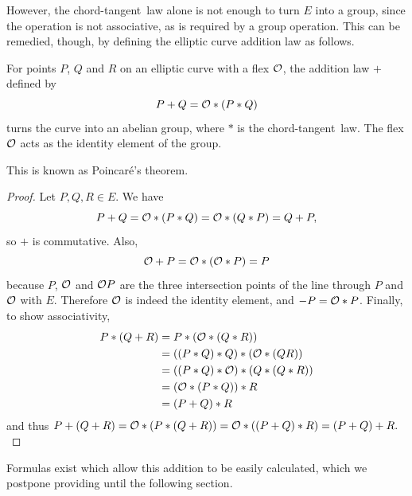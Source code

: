 However, the chord-tangent~law alone is not enough to turn $E$ into a group, since the operation is not associative, as is required by a group operation.
This can be remedied, though, by defining the elliptic curve addition law as follows.
\begin{theorem}
	For points $P$, $Q$ and $R$ on an elliptic curve with a flex $\mathcal{O}$, the addition law $+$ defined by
	$$P + Q = \mathcal{O} * (P * Q)$$
	turns the curve into an abelian group, where $*$ is the chord-tangent~law.
	The flex $\mathcal{O}$ acts as the identity element of the group.
\end{theorem}
This is known as Poincaré's theorem.
\begin{proof}
	Let $P,Q,R \in E$.
	We have
	$$P + Q = \mathcal{O} * (P * Q) = \mathcal{O} * (Q * P) = Q + P,$$
	so $+$ is commutative.
	Also,
	$$\mathcal{O} + P = \mathcal{O} * (\mathcal{O} * P) = P$$
	because $P$, $\mathcal{O}$ and $\mathcal{O} P$ are the three intersection points of the line through $P$ and $\mathcal{O}$ with $E$.
	Therefore $\mathcal{O}$ is indeed the identity element, and $-P = \mathcal{O} * P$.
	Finally, to show associativity,
	\begin{align*}
		P * (Q + R) &= P * (\mathcal{O} * ( Q * R))\\
		&= ((P*Q)*Q)*(\mathcal{O}*(QR))\\
		&= ((P*Q)*\mathcal{O})*(Q*(Q*R))\\
		&= (\mathcal{O} * (P*Q))*R\\
		&= (P + Q) * R
	\end{align*}
	and thus $P + (Q + R) = \mathcal{O} * (P * (Q + R)) = \mathcal{O} *((P + Q) * R) = (P + Q) + R.$
\end{proof}

Formulas exist which allow this addition to be easily calculated, which we postpone providing until the following section.
